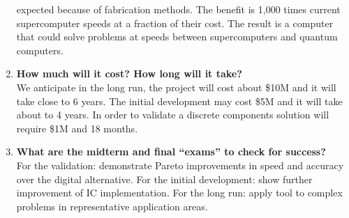 \documentclass[12pt]{article}
\begin{document}
\begin{enumerate}
            expected because of fabrication methods. 
            The benefit is 1,000 times current supercomputer speeds 
            at a fraction of their cost.
            The result is a computer that could solve problems at speeds between 
            supercomputers and quantum computers.
            \\[-7.5mm]
        \item[\SSeis]    
            \textbf{How much will it cost? How long will it take?}\\
            We anticipate in the long run, the project will cost about \$10M
            and it will take close to 6 years.
            The initial development may cost \$5M and it will take about to 4 
            years.
            In order to validate a discrete components solution will require 
            \$1M and 18 months.
            \\[-7.5mm]
        \item[\SSiete]   
            \textbf{What are the midterm and final ``exams'' to 
            check for success?}\\
            For the validation: demonstrate Pareto improvements in speed and accuracy   
            over the digital alternative.
            For the initial development: show further improvement of IC implementation.
            For the long run: apply tool to complex problems in representative 
            application areas.
    \end{enumerate}
\end{document}
